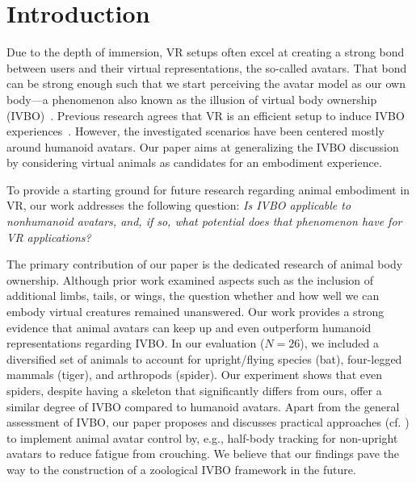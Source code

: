 \section{Introduction}




Due to the depth of immersion, VR setups often excel at creating a strong bond between users and their virtual representations, the so-called avatars. That bond can be strong enough such that we start perceiving the avatar model as our own body---a phenomenon also known as the illusion of virtual body ownership (IVBO)~\cite{slater2010first}. Previous research agrees that VR is an efficient setup to induce IVBO experiences~\cite{slater2009inducing,slater2010first,waltemate2018impact}. However, the investigated scenarios have been centered mostly around humanoid avatars. Our paper aims at generalizing the IVBO discussion by considering virtual animals as candidates for an embodiment experience.

To provide a starting ground for future research regarding animal embodiment in VR, our work addresses the following question: \textit{Is IVBO applicable to nonhumanoid avatars, and, if so, what potential does that phenomenon have for VR applications?} 

The primary contribution of our paper is the dedicated research of animal body ownership. Although prior work examined aspects such as the inclusion of additional limbs, tails, or wings, the question whether and how well we can embody virtual creatures remained unanswered. Our work provides a strong evidence that animal avatars can keep up and even outperform humanoid representations regarding IVBO. In our evaluation ($N=26$), we included a diversified set of animals to account for upright/flying species (bat), four-legged mammals (tiger), and arthropods (spider). Our experiment shows that even spiders, despite having a skeleton that significantly differs from ours, offer a similar degree of IVBO compared to humanoid avatars. Apart from the general assessment of IVBO, our paper proposes and discusses practical approaches (cf. ) to implement animal avatar control by, e.g., half-body tracking for non-upright avatars to reduce fatigue from crouching. We believe that our findings pave the way to the construction of a zoological IVBO framework in the future.



